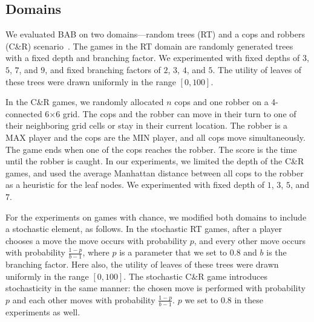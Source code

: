 \documentclass[letterpaper]{article} %
\newcounter{bab}
\newcommand{\pess}{\mathit{L}}
\newcommand{\opti}{\mathit{U}}
\newcommand{\vmax}{v_{\text{max}}}
\newcommand{\vmin}{v_{\text{min}}}
\newcommand{\amb}{\textit{AMB}}
\newcommand{\er}{\textit{ER}}
\begin{document}



\subsection{Domains}
We evaluated BAB on two domains---random trees (RT) and a cops and robbers (C\&R) scenario~\cite{moldenhauer2009evaluating}. The games in the RT domain are randomly generated trees with a fixed depth and branching factor. We experimented with 
fixed depths of $3$, $5$, $7$, and $9$, and fixed branching factors of $2$, $3$, $4$, and $5$. 
The utility of leaves of these trees were drawn uniformly in the range $[0, 100]$. 

In the C\&R games, we randomly allocated $n$ cops and one robber on a 4-connected 6$\times$6 grid. The cops and the robber can move in their turn to one of their neighboring grid cells or stay in their current location. The robber is a MAX player and the cops are the MIN player, and all cops move simultaneously. The game ends when one of the cops reaches the robber. The score is the time until the robber is caught. 
In our experiments, we limited the depth of the C\&R games, and used the average Manhattan distance between all cops to the robber as a heuristic for the leaf nodes. We experimented with fixed depth of $1$, $3$, $5$, and $7$.


For the experiments on games with chance, we modified both domains to include a stochastic element, as follows. In the stochastic RT games, after a player chooses a move the move occurs with probability $p$, and every other move occurs with probability $\frac{1-p}{b-1}$, where $p$ is a parameter that we set to $0.8$ and $b$ is the branching factor. Here also, the utility of leaves of these trees were drawn uniformly in the range $[0, 100]$. %
The stochastic C\&R game introduces stochasticity in the same manner: the chosen move is performed with probability $p$ and each other moves with probability $\frac{1-p}{b-1}$. $p$ we set to 0.8 in these experiments as well. 
\end{document}
